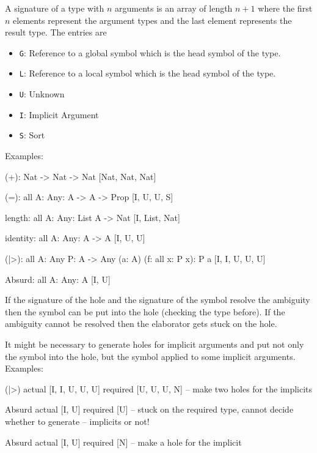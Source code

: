 A signature of a type with $n$ arguments is an array of length $n+1$ where the
first $n$ elements represent the argument types and the last element represents
the result type. The entries are
\begin{itemize}
    \item {\tt G}: Reference to a global symbol which is the head symbol of the
        type.
    \item {\tt L}: Reference to a local symbol which is the head symbol of the
        type.
    \item {\tt U}: Unknown
    \item {\tt I}: Implicit Argument
    \item {\tt S}: Sort
\end{itemize}
%
%
Examples:
\begin{alba}
    (+): Nat -> Nat -> Nat
            [Nat, Nat, Nat]

    (=): all {A: Any}: A -> A -> Prop
            [I, U, U, S]

    length: all {A: Any}: List A -> Nat
            [I, List, Nat]

    identity: all {A: Any}: A -> A
            [I, U, U]

    (|>): all {A: Any} {P: A -> Any} (a: A) (f: all x: P x): P a
            [I, I, U, U, U]

    Absurd: all {A: Any}: A
            [I, U]
\end{alba}
%
If the signature of the hole and the signature of the symbol resolve the
ambiguity then the symbol can be put into the hole (checking the type before).
If the ambiguity cannot be resolved then the elaborator gets stuck on the hole.

It might be necessary to generate holes for implicit arguments and put not only
the symbol into the hole, but the symbol applied to some implicit arguments.
%
Examples:
\begin{alba}
    (|>)        actual                  [I, I, U, U, U]
                required                      [U, U, U, N]
        -- make two holes for the implicits

    Absurd      actual                  [I, U]
                required                [U]
        -- stuck on the required type, cannot decide whether to generate
        -- implicits or not!

    Absurd      actual                  [I, U]
                required                   [N]
        -- make a hole for the implicit
\end{alba}

